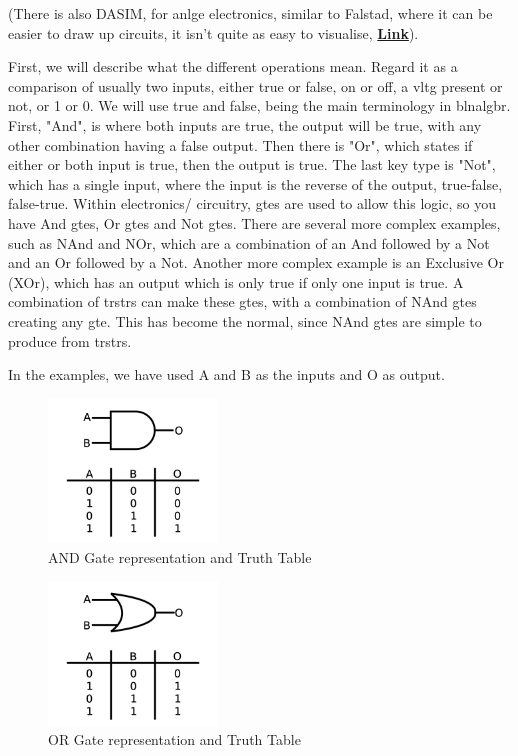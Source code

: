 \documentclass[a4paper,11pt]{report}
\let\oldhref\href %
\renewcommand{\href}[2]{\oldhref{#1}{\bfseries#2}}
\begin{document}
(There is also DASIM, for \gls{anlge} electronics, similar to Falstad, where it can be easier to draw up circuits, it isn't quite as easy to visualise, \href{https://www-users.york.ac.uk/~dajp1/Temp/dasim.html}{Link}).

First, we will describe what the different operations mean. Regard it as a comparison of usually two inputs, either true or false, on or off, a \gls{vltg} present or not, or 1 or 0. We will use true and false, being the main terminology in \gls{blnalgbr}. First, "And", is where both inputs are true, the output will be true, with any other combination having a false output. Then there is "Or", which states if either or both input is true, then the output is true. The last key type is "Not", which has a single input, where the input is the reverse of the output, true-false, false-true. Within electronics/ circuitry, \gls{gte}s are used to allow this logic, so you have And \gls{gte}s, Or \gls{gte}s and Not \gls{gte}s. There are several more complex examples, such as NAnd and NOr, which are a combination of an And followed by a Not and an Or followed by a Not. Another more complex example is an Exclusive Or (XOr), which has an output which is only true if only one input is true. A combination of \gls{trstr}s can make these \gls{gte}s, with a combination of NAnd \gls{gte}s creating any \gls{gte}. This has become the normal, since NAnd \gls{gte}s are simple to produce from \gls{trstr}s.

In the examples, we have used A and B as the inputs and O as output.
\begin{figure}[H]
\centering
\includegraphics[width=0.4\textwidth]{andgate1}
\caption{AND Gate representation and Truth Table}
\end{figure}

\begin{figure}[H]
\centering
\includegraphics[width=0.4\textwidth]{orgate1}
\caption{OR Gate representation and Truth Table}
\end{figure}
\end{document}
